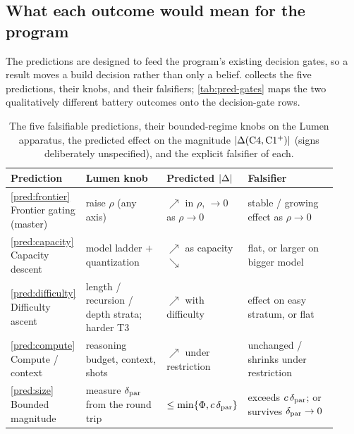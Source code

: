 \subsection{What each outcome would mean for the program}
\label{subsec:decision-map}

The predictions are designed to feed the program's existing decision gates, so a
result moves a build decision rather than only a belief. 
collects the five predictions, their knobs, and their falsifiers;
\cref{tab:pred-gates} maps the two qualitatively different battery outcomes onto
the decision-gate rows.

\begin{table}[t]
\centering
\small
\renewcommand{\arraystretch}{1.15}
\begin{tabular}{@{}>{\raggedright\arraybackslash}p{0.20\linewidth}>{\raggedright\arraybackslash}p{0.26\linewidth}>{\raggedright\arraybackslash}p{0.16\linewidth}>{\raggedright\arraybackslash}p{0.30\linewidth}@{}}
\toprule
Prediction & Lumen knob & Predicted $|\Delta|$ & Falsifier \\
\midrule
\cref{pred:frontier} Frontier gating (master) &
  raise $\rho$ (any axis) & $\nearrow$ in $\rho$, $\to 0$ as $\rho\to 0$ &
  stable / growing effect as $\rho\to 0$ \\
\cref{pred:capacity} Capacity descent &
  model ladder $+$ quantization & $\nearrow$ as capacity $\searrow$ &
  flat, or larger on bigger model \\
\cref{pred:difficulty} Difficulty ascent &
  length / recursion / depth strata; harder T3 & $\nearrow$ with difficulty &
  effect on easy stratum, or flat \\
\cref{pred:compute} Compute / context &
  reasoning budget, context, shots & $\nearrow$ under restriction &
  unchanged / shrinks under restriction \\
\cref{pred:size} Bounded magnitude &
  measure $\delta_{\mathrm{par}}$ from the round trip & $\le\min\{\Phi,c\,\delta_{\mathrm{par}}\}$ &
  exceeds $c\,\delta_{\mathrm{par}}$; or survives $\delta_{\mathrm{par}}\to0$ \\
\bottomrule
\end{tabular}
\caption{The five falsifiable predictions, their bounded-regime knobs on the
Lumen apparatus, the predicted effect on the magnitude
$|\Delta(\mathrm{C}4,\mathrm{C1^{+}})|$ (signs deliberately unspecified), and
the explicit falsifier of each.}
\label{tab:pred-summary}
\end{table}

